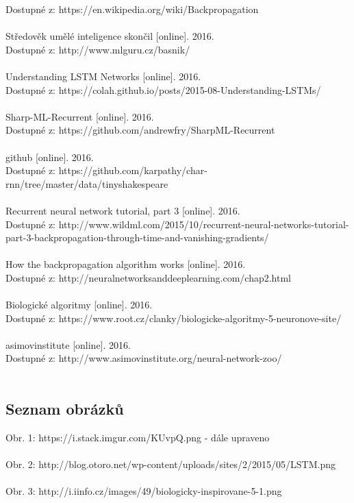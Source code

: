 \documentclass[a4paper]{article}
\begin{document}
Dostupné z: https://en.wikipedia.org/wiki/Backpropagation\\%
~\\
Středověk umělé inteligence skončil [online]. 2016.\\
Dostupné z: http://www.mlguru.cz/basnik/\\%
~\\
Understanding LSTM Networks [online]. 2016.\\
Dostupné z: https://colah.github.io/posts/2015-08-Understanding-LSTMs/\\%
~\\
Sharp-ML-Recurrent [online]. 2016.\\
Dostupné z: https://github.com/andrewfry/SharpML-Recurrent\\%
~\\
github [online]. 2016.\\
Dostupné z: https://github.com/karpathy/char-rnn/tree/master/data/tinyshakespeare\\%
~\\
Recurrent neural network tutorial, part 3 [online]. 2016.\\
Dostupné z: http://www.wildml.com/2015/10/recurrent-neural-networks-tutorial-part-3-backpropagation-through-time-and-vanishing-gradients/\\
~\\
How the backpropagation algorithm works [online]. 2016.\\
Dostupné z: http://neuralnetworksanddeeplearning.com/chap2.html\\%
~\\
Biologické algoritmy [online]. 2016.\\
Dostupné z: https://www.root.cz/clanky/biologicke-algoritmy-5-neuronove-site/\\%
~\\
asimovinstitute [online]. 2016. \\
Dostupné z: http://www.asimovinstitute.org/neural-network-zoo/\\%
~\\

\clearpage
\begin{center}
\section*{Seznam obrázků}
\end{center}
Obr. 1: https://i.stack.imgur.com/KUvpQ.png - dále upraveno\\
~\\
Obr. 2: http://blog.otoro.net/wp-content/uploads/sites/2/2015/05/LSTM.png\\
~\\
Obr. 3: http://i.iinfo.cz/images/49/biologicky-inspirovane-5-1.png\\
\end{document}
